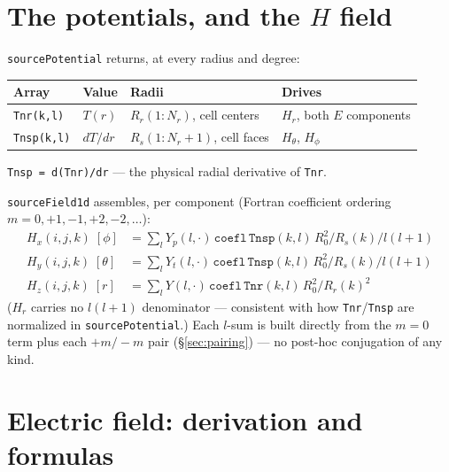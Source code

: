 \documentclass[11pt]{article}
\begin{document}
\section{The potentials, and the $H$ field}
\label{sec:H}

\texttt{sourcePotential} returns, at every radius and degree:

\begin{table}[h]
\centering
\begin{tabular}{llll}
\toprule
Array & Value & Radii & Drives \\
\midrule
\texttt{Tnr(k,l)}  & $T(r)$   & $R_r(1{:}N_r)$, cell centers & $H_r$, both $E$ components \\
\texttt{Tnsp(k,l)} & $dT/dr$  & $R_s(1{:}N_r{+}1)$, cell faces & $H_\theta$, $H_\phi$ \\
\bottomrule
\end{tabular}
\end{table}

\texttt{Tnsp = d(Tnr)/dr} --- the physical radial derivative of \texttt{Tnr}.

\texttt{sourceField1d} assembles, per component (Fortran coefficient ordering
$m=0,{+}1,{-}1,{+}2,{-}2,\dots$):
\begin{align}
H_x(i,j,k)\;[\phi]     &= \sum_l Y_p(l,\cdot)\,\mathtt{coefl}\,\mathtt{Tnsp}(k,l)\,R_0^2/R_s(k)/l(l{+}1) \\
H_y(i,j,k)\;[\theta]   &= \sum_l Y_t(l,\cdot)\,\mathtt{coefl}\,\mathtt{Tnsp}(k,l)\,R_0^2/R_s(k)/l(l{+}1) \\
H_z(i,j,k)\;[r]        &= \sum_l Y(l,\cdot)\,\mathtt{coefl}\,\mathtt{Tnr}(k,l)\,R_0^2/R_r(k)^2
\end{align}
($H_r$ carries no $l(l{+}1)$ denominator --- consistent with how \texttt{Tnr}/\texttt{Tnsp} are
normalized in \texttt{sourcePotential}.) Each $l$-sum is built directly from the $m=0$ term plus
each $+m/-m$ pair (\S\ref{sec:pairing}) --- no post-hoc conjugation of any kind.

\section{Electric field: derivation and formulas}
\label{sec:E}
\end{document}
